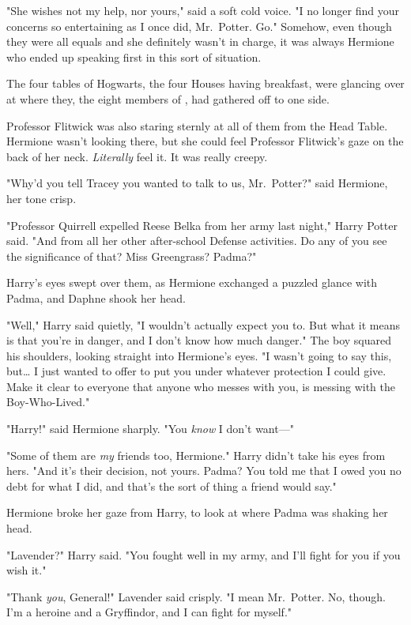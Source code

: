 "She wishes not my help, nor yours," said a soft cold voice. "I no longer find
your concerns so entertaining as I once did, Mr.~Potter. Go."
\later
Somehow, even though they were all equals and she definitely wasn't in charge,
it was always Hermione who ended up speaking first in this sort of situation.

The four tables of Hogwarts, the four Houses having breakfast, were glancing
over at where they, the eight members of \SPHEW, had gathered off to one
side.

Professor Flitwick was also staring sternly at all of them from the Head Table.
Hermione wasn't looking there, but she could feel Professor Flitwick's gaze on
the back of her neck. \emph{Literally} feel it. It was really creepy.

"Why'd you tell Tracey you wanted to talk to us, Mr.~Potter?" said Hermione,
her tone crisp.

"Professor Quirrell expelled Reese Belka from her army last night," Harry
Potter said. "And from all her other after-school Defense activities. Do any of
you see the significance of that? Miss Greengrass? Padma?"

Harry's eyes swept over them, as Hermione exchanged a puzzled glance with
Padma, and Daphne shook her head.

"Well," Harry said quietly, "I wouldn't actually expect you to. But what it
means is that you're in danger, and I don't know how much danger." The boy
squared his shoulders, looking straight into Hermione's eyes. "I wasn't going
to say this, but{\ldots} I just wanted to offer to put you under whatever
protection I could give. Make it clear to everyone that anyone who messes with
you, is messing with the Boy-Who-Lived."

"Harry!" said Hermione sharply. "You \emph{know} I don't want---"

"Some of them are \emph{my} friends too, Hermione." Harry didn't take his eyes
from hers. "And it's their decision, not yours. Padma? You told me that I owed
you no debt for what I did, and that's the sort of thing a friend would say."

Hermione broke her gaze from Harry, to look at where Padma was shaking her head.

"Lavender?" Harry said. "You fought well in my army, and I'll fight for you if
you wish it."

"Thank \emph{you}, General!" Lavender said crisply. "I mean Mr.~Potter. No,
though. I'm a heroine and a Gryffindor, and I can fight for myself."


